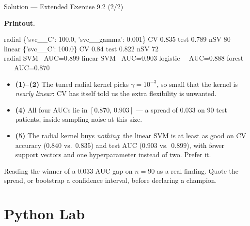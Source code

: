 \documentclass[aspectratio=169,11pt]{beamer}
\begin{document}
\begin{frame}{Solution --- Extended Exercise 9.2 (2/2)}
\begin{solutionbox}
  \scriptsize
  \textbf{Printout.}
  \begin{center}\ttfamily\tiny
  radial \{'svc\_\_C': 100.0, 'svc\_\_gamma': 0.001\} CV 0.835 test 0.789 nSV 80\\
  linear \{'svc\_\_C': 100.0\} CV 0.84 test 0.822 nSV 72\\[2pt]
  radial SVM \ AUC=0.899 \quad linear SVM \ AUC=0.903 \quad
  logistic \ \ AUC=0.888 \quad forest \ \ \ AUC=0.870
  \end{center}
  \begin{itemize}
    \item \textbf{(1)--(2)} The tuned radial kernel picks $\gamma=10^{-3}$, so
          small that the kernel is \emph{nearly linear}: CV has itself told us
          the extra flexibility is unwanted.
    \item \textbf{(4)} All four AUCs lie in $[0.870,\,0.903]$ --- a spread of
          $0.033$ on $90$ test patients, inside sampling noise at this size.
    \item \textbf{(5)} The radial kernel buys \emph{nothing}: the linear SVM is
          at least as good on CV accuracy ($0.840$ vs.\ $0.835$) and test AUC
          ($0.903$ vs.\ $0.899$), with fewer support vectors and one
          hyperparameter instead of two. Prefer it.
  \end{itemize}
\end{solutionbox}
\begin{mistake}
  Reading the winner of a $0.033$ AUC gap on $n=90$ as a real finding. Quote
  the spread, or bootstrap a confidence interval, before declaring a champion.
\end{mistake}
\end{frame}

\section{Python Lab}
\end{document}
